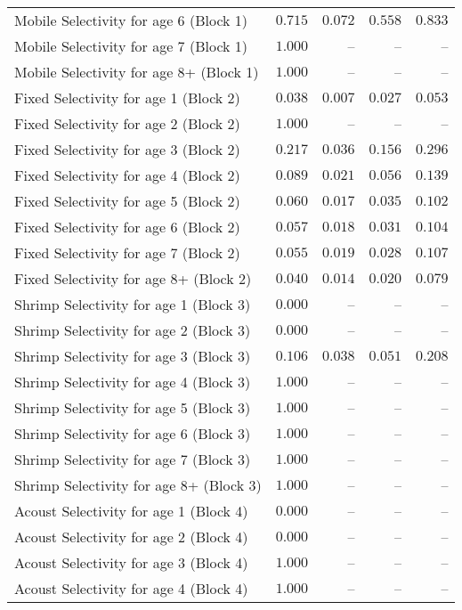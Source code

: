 \documentclass[
]{article}
\begin{document}
\begin{landscape}
\begin{longtable}[t]{lrrrr}
Mobile Selectivity for age 6 (Block 1) & $0.715$ & $0.072$ & $0.558$ & $0.833$\\
Mobile Selectivity for age 7 (Block 1) & $1.000$ & -- & -- & --\\
\addlinespace
Mobile Selectivity for age 8+ (Block 1) & $1.000$ & -- & -- & --\\
Fixed Selectivity for age 1 (Block 2) & $0.038$ & $0.007$ & $0.027$ & $0.053$\\
Fixed Selectivity for age 2 (Block 2) & $1.000$ & -- & -- & --\\
Fixed Selectivity for age 3 (Block 2) & $0.217$ & $0.036$ & $0.156$ & $0.296$\\
Fixed Selectivity for age 4 (Block 2) & $0.089$ & $0.021$ & $0.056$ & $0.139$\\
\addlinespace
Fixed Selectivity for age 5 (Block 2) & $0.060$ & $0.017$ & $0.035$ & $0.102$\\
Fixed Selectivity for age 6 (Block 2) & $0.057$ & $0.018$ & $0.031$ & $0.104$\\
Fixed Selectivity for age 7 (Block 2) & $0.055$ & $0.019$ & $0.028$ & $0.107$\\
Fixed Selectivity for age 8+ (Block 2) & $0.040$ & $0.014$ & $0.020$ & $0.079$\\
Shrimp Selectivity for age 1 (Block 3) & $0.000$ & -- & -- & --\\
\addlinespace
Shrimp Selectivity for age 2 (Block 3) & $0.000$ & -- & -- & --\\
Shrimp Selectivity for age 3 (Block 3) & $0.106$ & $0.038$ & $0.051$ & $0.208$\\
Shrimp Selectivity for age 4 (Block 3) & $1.000$ & -- & -- & --\\
Shrimp Selectivity for age 5 (Block 3) & $1.000$ & -- & -- & --\\
Shrimp Selectivity for age 6 (Block 3) & $1.000$ & -- & -- & --\\
\addlinespace
Shrimp Selectivity for age 7 (Block 3) & $1.000$ & -- & -- & --\\
Shrimp Selectivity for age 8+ (Block 3) & $1.000$ & -- & -- & --\\
Acoust Selectivity for age 1 (Block 4) & $0.000$ & -- & -- & --\\
Acoust Selectivity for age 2 (Block 4) & $0.000$ & -- & -- & --\\
Acoust Selectivity for age 3 (Block 4) & $1.000$ & -- & -- & --\\
\addlinespace
Acoust Selectivity for age 4 (Block 4) & $1.000$ & -- & -- & --\\

\end{longtable}
\end{landscape}
\end{document}
